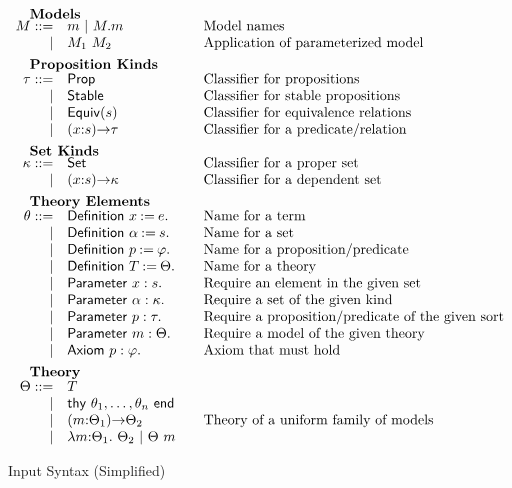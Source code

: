 \begin{figure}
\[\begin{array}{rl@{\qquad}l}
		\noalign{\textbf{Models}}		
		\im ::= 
		    & \iM  \ibar \iselect{\im}{\iM}&\mbox{Model names}\\
		  | & \iapp{\im_1}{\im_2}&\mbox{Application of parameterized model}\\[5pt]
		
		\noalign{\textbf{Proposition Kinds}}
		\ipt ::=
		    & \iProp & \mbox{Classifier for propositions}\\
		  | & \iStable & \mbox{Classifier for stable propositions}\\
		  | & \iEquiv{\is} &\mbox{Classifier for equivalence relations}\\
		  | & \idarrow{\ix}{\is}{\ipt} & \mbox{Classifier for a predicate/relation}\\[5pt] 
		
		\noalign{\textbf{Set Kinds}}
		\ik ::= 
		    & \iSet &\mbox{Classifier for a proper set}\\
		   | & \idarrow{\ix}{\is}{\ik} &\mbox{Classifier for a dependent set}\\[5pt]
		

		\noalign{\textbf{Theory Elements}}
		\ite ::=
		     & \iDefinition{\ix}{\ie}.&\mbox{Name for a term}\\
		   | & \iDefinition{\iS}{\is}.&\mbox{Name for a set}\\
		   | & \iDefinition{\iP}{\ip}.&\mbox{Name for a proposition/predicate}\\
		   | & \iDefinition{\iTH}{\ith}.&\mbox{Name for a theory}\\
		   | & \iParameter{\ix}{\is}.&\mbox{Require an element in the given set}\\
		   | & \iParameter{\iS}{\ik}.&\mbox{Require a set of the given kind}\\
		   | & \iParameter{\iP}{\ipt}.&\mbox{Require a proposition/predicate of the given sort}\\
		   | & \iParameter{\iM}{\ith}.&\mbox{Require a model of the given theory}\\
		   | & \iAxiom{\iP}{\ip}.&\mbox{Axiom that must hold}\\[5pt]

  		\noalign{\textbf{Theory}}
		\ith ::= 
		     & \iTH\\
		   	| & \ithy{\ite_1,\ldots,\ite_n}\\
		 	| & \idarrow{\iM}{\ith_1}{\ith_2} &\mbox{Theory of a uniform family of models}\\
		  	| & \ilambda{\iM}{\ith_1}{\ith_2} \ibar 
		      \iapp{\ith}{\iM}\\
	\end{array}
	\]
	\label{fig:input}
	\caption{Input Syntax (Simplified)}
\end{figure}





